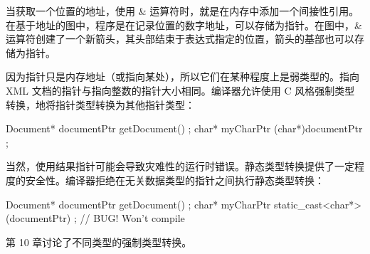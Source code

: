 当获取一个位置的地址，使用 \& 运算符时，就是在内存中添加一个间接性引用。在基于地址的图中，程序是在记录位置的数字地址，可以存储为指针。在图中，\& 运算符创建了一个新箭头，其头部结束于表达式指定的位置，箭头的基部也可以存储为指针。


因为指针只是内存地址（或指向某处），所以它们在某种程度上是弱类型的。指向 XML 文档的指针与指向整数的指针大小相同。编译器允许使用 C 风格强制类型转换，地将指针类型转换为其他指针类型：

\begin{cpp}
Document* documentPtr { getDocument() };
char* myCharPtr { (char*)documentPtr };
\end{cpp}

当然，使用结果指针可能会导致灾难性的运行时错误。静态类型转换提供了一定程度的安全性。编译器拒绝在无关数据类型的指针之间执行静态类型转换：

\begin{cpp}
Document* documentPtr { getDocument() };
char* myCharPtr { static_cast<char*>(documentPtr) }; // BUG! Won't compile
\end{cpp}

第 10 章讨论了不同类型的强制类型转换。














